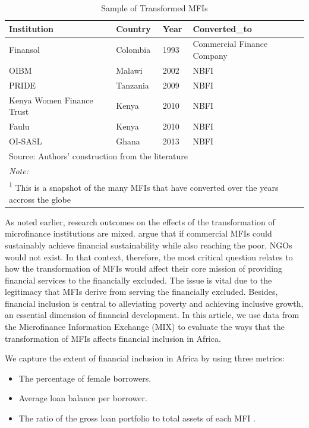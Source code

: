\documentclass[a4paper, nobind]{templates/ociamthesis}
\providecommand{\tightlist}{%
  \setlength{\itemsep}{0pt}\setlength{\parskip}{0pt}}
\begin{document}
\begin{table}

\caption{\label{tab:unnamed-chunk-51}Sample of Transformed MFIs}
\centering
\fontsize{9}{11}\selectfont
\begin{tabular}[t]{llll}
\toprule
Institution & Country & Year & Converted\_to\\
\midrule
Finansol & Colombia & 1993 & Commercial Finance Company\\
OIBM & Malawi & 2002 & NBFI\\
PRIDE & Tanzania & 2009 & NBFI\\
Kenya Women Finance Trust & Kenya & 2010 & NBFI\\
Faulu & Kenya & 2010 & NBFI\\
\addlinespace
OI-SASL & Ghana & 2013 & NBFI\\
\bottomrule
\multicolumn{4}{l}{\rule{0pt}{1em}Source: Authors' construction from the literature}\\
\multicolumn{4}{l}{\rule{0pt}{1em}\textit{Note: }}\\
\multicolumn{4}{l}{\rule{0pt}{1em}\textsuperscript{1} This is a snapshot of the many MFIs that have converted over the years accross the globe}\\
\end{tabular}
\end{table}

As noted earlier, research outcomes on the effects of the transformation of microfinance institutions are mixed. \textcite{morduch2019challenges} argue that if commercial MFIs could sustainably achieve financial sustainability while also reaching the poor, NGOs would not exist. In that context, therefore, the most critical question relates to how the transformation of MFIs would affect their core mission of providing financial services to the financially excluded. The issue is vital due to the legitimacy that MFIs derive from serving the financially excluded. Besides, financial inclusion is central to alleviating poverty and achieving inclusive growth, an essential dimension of financial development. In this article, we use data from the Microfinance Information Exchange (MIX) to evaluate the ways that the transformation of MFIs affects financial inclusion in Africa.

We capture the extent of financial inclusion in Africa by using three metrics:

\begin{itemize}
\tightlist
\item
  The percentage of female borrowers.
\item
  Average loan balance per borrower.
\item
  The ratio of the gross loan portfolio to total assets of each MFI \autocite{d2017ngos}.
\end{itemize}
\end{document}
